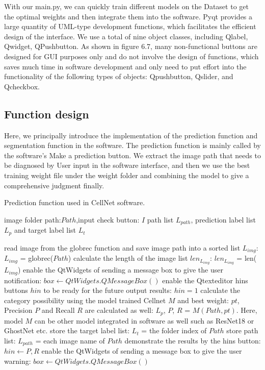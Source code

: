 {\begin{figure}[t]
\end{figure}
With our main.py, we can quickly train different models on the Dataset to get the optimal weights and then integrate them into the software. Pyqt provides a large quantity of UML-type development functions, which facilitates the efficient design of the interface. We use a total of nine object classes, including Qlabel, Qwidget, QPushbutton. As shown in figure 6.7, many non-functional buttons are designed for GUI purposes only and do not involve the design of functions, which saves much time in software development and only need to put effort into the functionality of the following types of objects: Qpushbutton, Qslider, and Qcheckbox.


\subsection{Function design} %
\label{sub:amet}
Here, we principally introduce the implementation of the prediction function and segmentation function in the software. The prediction function is mainly called by the software's Make a prediction button. We extract the image path that needs to be diagnosed by User input in the software interface, and then we use the best training weight file under the weight folder and combining the model to give a comprehensive judgment finally.






\begin{algorithm}[b]
  \caption{Prediction function used in CellNet software.}
  \label{alg:Framwork}
  \begin{algorithmic}[1]
    \Require
    image folder path:$Path$,input check button: $I$
    \Ensure
     path list $L_{path}$, prediction label list $L_{p}$ and target label list $L_{t}$
  
      \State  read image from the globrec function and save image path into a sorted list $L_{img}$: $L_{img}$ = globrec($Path$)
      \State  calculate the length of the image list $len_{L_{img}}$: $len_{L_{img}}$ = len($L_{img}$)
      \State  enable the QtWidgets of sending a message box to give the user notification: $box  \gets QtWidgets.QMessageBox()$
      \State  enable the Qtexteditor  hins buttons $hin$ to be ready for the future output results: $ hin = 1$
      \State  calculate the category possibility using the model trained Cellnet $M$ and best weight: $pt$, Precision $P$ and Recall $R$ are calculated as well: $L_{p}$, $P$, $R$ = $M(Path,pt)$. Here, model $M$ can be other model integrated in software as well such as ResNet18 or GhostNet etc.
      \State  store the target label list: $L_{t}$ = the folder index of $Path$
      \State  store path list: $L_{path}$ = each image name of $Path$
      \State  demonstrate the results by the hins button: $hin  \gets P, R$
    \Else
      \State  enable the QtWidgets of sending a message box to give the user warning: $box  \gets QtWidgets.QMessageBox()$
      

\end{algorithmic}
\end{algorithm}}
